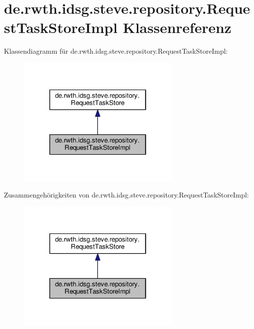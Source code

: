 \hypertarget{classde_1_1rwth_1_1idsg_1_1steve_1_1repository_1_1_request_task_store_impl}{\section{de.\-rwth.\-idsg.\-steve.\-repository.\-Request\-Task\-Store\-Impl Klassenreferenz}
\label{classde_1_1rwth_1_1idsg_1_1steve_1_1repository_1_1_request_task_store_impl}
}


Klassendiagramm für de.\-rwth.\-idsg.\-steve.\-repository.\-Request\-Task\-Store\-Impl\-:
\nopagebreak
\begin{figure}[H]
\begin{center}
\leavevmode
\includegraphics[width=226pt]{classde_1_1rwth_1_1idsg_1_1steve_1_1repository_1_1_request_task_store_impl__inherit__graph}
\end{center}
\end{figure}


Zusammengehörigkeiten von de.\-rwth.\-idsg.\-steve.\-repository.\-Request\-Task\-Store\-Impl\-:
\nopagebreak
\begin{figure}[H]
\begin{center}
\leavevmode
\includegraphics[width=226pt]{classde_1_1rwth_1_1idsg_1_1steve_1_1repository_1_1_request_task_store_impl__coll__graph}
\end{center}
\end{figure}
